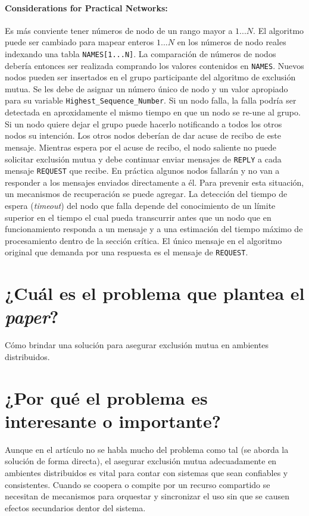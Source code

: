 \paragraph{\textnormal{\textbf{Considerations for Practical Networks:}}} 
Es más conviente tener números de nodo de un rango mayor a $1...N$. El algoritmo puede ser cambiado para mapear enteros $1...N$ en los números de nodo reales indexando una tabla \texttt{NAMES[1...N]}. La comparación de números de nodos debería entonces ser realizada comprando los valores contenidos en \texttt{NAMES}. Nuevos nodos pueden ser insertados en el grupo participante del algoritmo de exclusión mutua. Se les debe de asignar un número único de nodo y un valor apropiado para su variable \texttt{Highest\_Sequence\_Number}. Si un nodo falla, la falla podría ser detectada en aproxidamente el mismo tiempo en que un nodo se re-une al grupo. Si un nodo quiere dejar el grupo puede hacerlo notificando a todos los otros nodos su intención. Los otros nodos deberían de dar acuse de recibo de este mensaje. Mientras espera por el acuse de recibo, el nodo saliente no puede solicitar exclusión mutua y debe continuar enviar mensajes de \texttt{REPLY} a cada mensaje \texttt{REQUEST} que recibe. En práctica algunos nodos fallarán y no van a responder a los mensajes enviados directamente a él. Para prevenir esta situación, un mecanismos de recuperación se puede agregar. La detección del tiempo de espera (\emph{timeout}) del nodo que falla depende del conocimiento de un límite superior en el tiempo el cual pueda transcurrir antes que un nodo que en funcionamiento responda a un mensaje y a una estimación del tiempo máximo de procesamiento dentro de la sección crítica. El único mensaje en el algoritmo original que demanda por una respuesta es el mensaje de \texttt{REQUEST}.

\section{¿Cuál es el problema que plantea el \textit{paper}?}
Cómo brindar una solución para asegurar exclusión mutua en ambientes distribuidos.

\section{¿Por qué el problema es interesante o importante?}
Aunque en el artículo no se habla mucho del problema como tal (se aborda la solución de forma directa), el asegurar exclusión mutua adecuadamente en ambientes distribuidos es vital para contar con sistemas que sean confiables y consistentes. Cuando se coopera o compite por un recurso compartido se necesitan de mecanismos para orquestar y sincronizar el uso sin que se causen efectos secundarios dentor del sistema.

